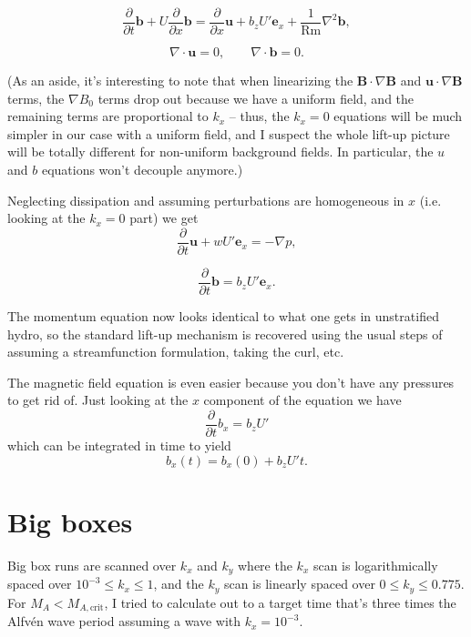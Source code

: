 \documentclass[%
 preprint,
 amsmath,amssymb,
 aps,
]{revtex4-2}
\begin{document}
\begin{equation} \label{eq:lin-induction}
\frac{\partial}{\partial t} \mathbf{b} + U \frac{\partial}{\partial x}\mathbf{b} = \frac{\partial}{\partial x}\mathbf{u} + b_z U' \mathbf{e}_x + \frac{1}{\mathrm{Rm}} \nabla^2 \mathbf{b},
\end{equation}

\begin{equation}
    \nabla \cdot \mathbf{u} = 0, \qquad \nabla \cdot \mathbf{b} = 0.
\end{equation}

(As an aside, it's interesting to note that when linearizing the $\mathbf{B} \cdot \nabla \mathbf{B}$ and $\mathbf{u} \cdot \nabla \mathbf{B}$ terms, the $\nabla B_0$ terms drop out because we have a uniform field, and the remaining terms are proportional to $k_x$ -- thus, the $k_x=0$ equations will be much simpler in our case with a uniform field, and I suspect the whole lift-up picture will be totally different for non-uniform background fields. In particular, the $u$ and $b$ equations won't decouple anymore.)

Neglecting dissipation and assuming perturbations are homogeneous in $x$ (i.e. looking at the $k_x=0$ part) we get
\begin{equation} \label{eq:kx0-momentum}
\frac{\partial}{\partial t} \mathbf{u} + wU' \mathbf{e}_x = - \nabla p,
\end{equation}

\begin{equation} \label{eq:kx0-induction}
\frac{\partial}{\partial t} \mathbf{b} = b_z U' \mathbf{e}_x.
\end{equation}

The momentum equation now looks identical to what one gets in unstratified hydro, so the standard lift-up mechanism is recovered using the usual steps of assuming a streamfunction formulation, taking the curl, etc.

The magnetic field equation is even easier because you don't have any pressures to get rid of. Just looking at the $x$ component of the equation we have
\begin{equation}
    \frac{\partial}{\partial t} b_x = b_z U'
\end{equation}
which can be integrated in time to yield
\begin{equation}
    b_x(t) = b_x(0) + b_z U' t.
\end{equation}

\section{Big boxes}
Big box runs are scanned over $k_x$ and $k_y$ where the $k_x$ scan is logarithmically spaced over $10^{-3} \leq k_x \leq 1$, and the $k_y$ scan is linearly spaced over $0 \leq k_y \leq 0.775$. For $M_A < M_{A, \mathrm{crit}}$, I tried to calculate out to a target time that's three times the Alfv\'{e}n wave period assuming a wave with $k_x = 10^{-3}$.
\end{document}
